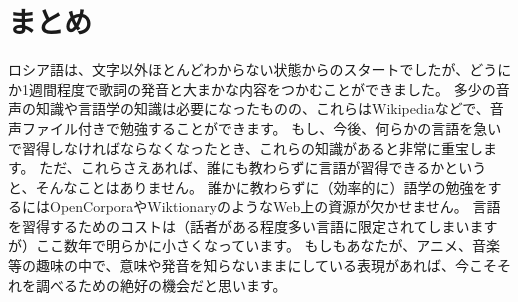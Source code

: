 \documentclass[12pt]{ltjsarticle}
\begin{document}
\bigskip

\section*{まとめ}

ロシア語は、文字以外ほとんどわからない状態からのスタートでしたが、どうにか1週間程度で歌詞の発音と大まかな内容をつかむことができました。
多少の音声の知識や言語学の知識は必要になったものの、これらはWikipediaなどで、音声ファイル付きで勉強することができます。
もし、今後、何らかの言語を急いで習得しなければならなくなったとき、これらの知識があると非常に重宝します。
ただ、これらさえあれば、誰にも教わらずに言語が習得できるかというと、そんなことはありません。
誰かに教わらずに（効率的に）語学の勉強をするにはOpenCorporaやWiktionaryのようなWeb上の資源が欠かせません。
言語を習得するためのコストは（話者がある程度多い言語に限定されてしまいますが）ここ数年で明らかに小さくなっています。
もしもあなたが、アニメ、音楽等の趣味の中で、意味や発音を知らないままにしている表現があれば、今こそそれを調べるための絶好の機会だと思います。\nocite{rusdict}

\bigskip

\end{document}
